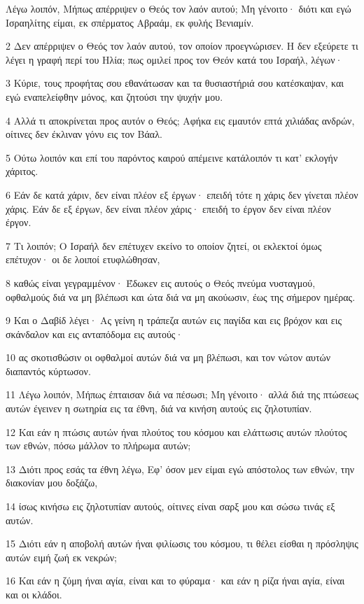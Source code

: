 \par Λέγω λοιπόν, Μήπως απέρριψεν ο Θεός τον λαόν αυτού; Μη γένοιτο· διότι και εγώ Ισραηλίτης είμαι, εκ σπέρματος Αβραάμ, εκ φυλής Βενιαμίν.
\par 2 Δεν απέρριψεν ο Θεός τον λαόν αυτού, τον οποίον προεγνώρισεν. Η δεν εξεύρετε τι λέγει η γραφή περί του Ηλία; πως ομιλεί προς τον Θεόν κατά του Ισραήλ, λέγων·
\par 3 Κύριε, τους προφήτας σου εθανάτωσαν και τα θυσιαστήριά σου κατέσκαψαν, και εγώ εναπελείφθην μόνος, και ζητούσι την ψυχήν μου.
\par 4 Αλλά τι αποκρίνεται προς αυτόν ο Θεός; Αφήκα εις εμαυτόν επτά χιλιάδας ανδρών, οίτινες δεν έκλιναν γόνυ εις τον Βάαλ.
\par 5 Ούτω λοιπόν και επί του παρόντος καιρού απέμεινε κατάλοιπόν τι κατ' εκλογήν χάριτος.
\par 6 Εάν δε κατά χάριν, δεν είναι πλέον εξ έργων· επειδή τότε η χάρις δεν γίνεται πλέον χάρις. Εάν δε εξ έργων, δεν είναι πλέον χάρις· επειδή το έργον δεν είναι πλέον έργον.
\par 7 Τι λοιπόν; Ο Ισραήλ δεν επέτυχεν εκείνο το οποίον ζητεί, οι εκλεκτοί όμως επέτυχον· οι δε λοιποί ετυφλώθησαν,
\par 8 καθώς είναι γεγραμμένον· Έδωκεν εις αυτούς ο Θεός πνεύμα νυσταγμού, οφθαλμούς διά να μη βλέπωσι και ώτα διά να μη ακούωσιν, έως της σήμερον ημέρας.
\par 9 Και ο Δαβίδ λέγει· Ας γείνη η τράπεζα αυτών εις παγίδα και εις βρόχον και εις σκάνδαλον και εις ανταπόδομα εις αυτούς·
\par 10 ας σκοτισθώσιν οι οφθαλμοί αυτών διά να μη βλέπωσι, και τον νώτον αυτών διαπαντός κύρτωσον.
\par 11 Λέγω λοιπόν, Μήπως έπταισαν διά να πέσωσι; Μη γένοιτο· αλλά διά της πτώσεως αυτών έγεινεν η σωτηρία εις τα έθνη, διά να κινήση αυτούς εις ζηλοτυπίαν.
\par 12 Και εάν η πτώσις αυτών ήναι πλούτος του κόσμου και ελάττωσις αυτών πλούτος των εθνών, πόσω μάλλον το πλήρωμα αυτών;
\par 13 Διότι προς εσάς τα έθνη λέγω, Εφ' όσον μεν είμαι εγώ απόστολος των εθνών, την διακονίαν μου δοξάζω,
\par 14 ίσως κινήσω εις ζηλοτυπίαν αυτούς, οίτινες είναι σαρξ μου και σώσω τινάς εξ αυτών.
\par 15 Διότι εάν η αποβολή αυτών ήναι φιλίωσις του κόσμου, τι θέλει είσθαι η πρόσληψις αυτών ειμή ζωή εκ νεκρών;
\par 16 Και εάν η ζύμη ήναι αγία, είναι και το φύραμα· και εάν η ρίζα ήναι αγία, είναι και οι κλάδοι.
